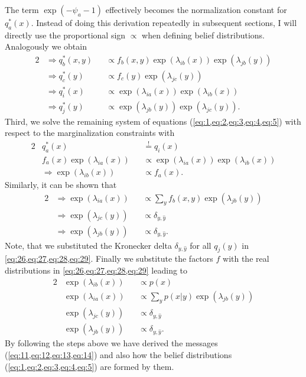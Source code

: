 The term \(\exp(-\psi_a - 1)\) effectively becomes the normalization constant for \(q_a^*(x)\). Instead of doing this derivation repeatedly in subsequent sections, I will directly use the proportional sign \(\propto\) when defining belief distributions.
Analogously we obtain
\begin{alignat}{2}
     & \Rightarrow q_b^*(x,y) &  & \propto f_b(x,y) \exp(\lambda_{ib}(x)) \exp(\lambda_{jb}(y)) \label{eq:2} \\
     & \Rightarrow q_c^*(y)   &  & \propto f_c(y) \exp(\lambda_{jc}(y))                         \label{eq:3} \\
     & \Rightarrow q_i^*(x)   &  & \propto \exp(\lambda_{ia}(x)) \exp(\lambda_{ib}(x))          \label{eq:4} \\
     & \Rightarrow q_j^*(y)   &  & \propto \exp(\lambda_{jb}(y)) \exp(\lambda_{jc}(y)).\label{eq:5}
\end{alignat}
Third, we solve the remaining system of equations (\cref{eq:1,eq:2,eq:3,eq:4,eq:5}) with respect to the marginalization constraints with
\begin{alignat}{2}
     & q_a^*(x)                          &  & \overset{!}{=} q_i(x)                               \\
     & f_a(x) \exp(\lambda_{ia}(x))      &  & \propto \exp(\lambda_{ia}(x)) \exp(\lambda_{ib}(x)) \\
     & \Rightarrow \exp(\lambda_{ib}(x)) &  & \propto f_a(x). \label{eq:26}
\end{alignat}
Similarly, it can be shown that
\begin{alignat}{2}
     & \Rightarrow \exp(\lambda_{ia}(x)) &  & \propto \sum_y f_b(x,y) \exp(\lambda_{jb}(y)) \label{eq:27} \\
     & \Rightarrow \exp(\lambda_{jc}(y)) &  & \propto \delta_{y,\hat{y}}    \label{eq:28}                 \\
     & \Rightarrow \exp(\lambda_{jb}(y)) &  & \propto \delta_{y,\hat{y}}. \label{eq:29}
\end{alignat}
Note, that we substituted the Kronecker delta \(\delta_{y,\hat{y}}\) for all \(q_j(y)\) in \cref{eq:26,eq:27,eq:28,eq:29}. Finally we substitute the factors \(f\) with the real distributions in \cref{eq:26,eq:27,eq:28,eq:29} leading to
\begin{alignat}{2}
     & \exp(\lambda_{ib}(x)) &  & \propto p(x) \label{eq:11}                                \\
     & \exp(\lambda_{ia}(x)) &  & \propto \sum_y p(x|y) \exp(\lambda_{jb}(y)) \label{eq:12} \\
     & \exp(\lambda_{jc}(y)) &  & \propto \delta_{y,\hat{y}} \label{eq:13}                  \\
     & \exp(\lambda_{jb}(y)) &  & \propto \delta_{y,\hat{y}}. \label{eq:14}
\end{alignat}
By following the steps above we have derived the messages (\cref{eq:11,eq:12,eq:13,eq:14}) and also how the belief distributions (\cref{eq:1,eq:2,eq:3,eq:4,eq:5}) are formed by them.

